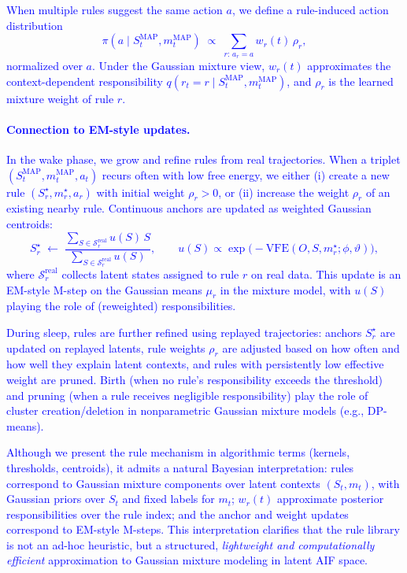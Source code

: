 \documentclass{article} %
\newcommand{\revise}[1]{\textcolor{blue}{#1}}
\begin{document}
\revise{When multiple rules suggest the same action $a$, we define a rule-induced action distribution
\[
\pi(a \mid S_t^{\mathrm{MAP}}, m_t^{\mathrm{MAP}}) \;\propto\;
\sum_{r:\,a_r = a} w_r(t)\,\rho_r,
\]
normalized over $a$. Under the Gaussian mixture view, $w_r(t)$ approximates the context-dependent responsibility $q(r_t = r \mid S_t^{\mathrm{MAP}},m_t^{\mathrm{MAP}})$, and $\rho_r$ is the learned mixture weight of rule $r$.}
\revise{\paragraph{Connection to EM-style updates.}
In the wake phase, we grow and refine rules from real trajectories. When a triplet $(S_t^{\mathrm{MAP}}, m_t^{\mathrm{MAP}}, a_t)$ recurs often with low free energy, we either (i) create a new rule $(S_r^\star, m_r^\star, a_r)$ with initial weight $\rho_r>0$, or (ii) increase the weight $\rho_r$ of an existing nearby rule. Continuous anchors are updated as weighted Gaussian centroids:
\[
S_r^\star \;\leftarrow\; 
\frac{\sum_{S \in \mathcal S_r^{\mathrm{real}}} u(S)\,S}
     {\sum_{S \in \mathcal S_r^{\mathrm{real}}} u(S)},
\qquad
u(S) \propto \exp\!\big(-\text{VFE}(O,S,m_r^\star;\phi,\vartheta)\big),
\]
where $\mathcal S_r^{\mathrm{real}}$ collects latent states assigned to rule $r$ on real data. This update is an EM-style M-step on the Gaussian means $\mu_r$ in the mixture model, with $u(S)$ playing the role of (reweighted) responsibilities.}

\revise{During sleep, rules are further refined using replayed trajectories: anchors $S_r^\star$ are updated on replayed latents, rule weights $\rho_r$ are adjusted based on how often and how well they explain latent contexts, and rules with persistently low effective weight are pruned. Birth (when no rule’s responsibility exceeds the threshold) and pruning (when a rule receives negligible responsibility) play the role of cluster creation/deletion in nonparametric Gaussian mixture models (e.g., DP-means).}


\revise{Although we present the rule mechanism in algorithmic terms (kernels, thresholds, centroids), it admits a natural Bayesian interpretation: rules correspond to Gaussian mixture components over latent contexts $(S_t,m_t)$, with Gaussian priors over $S_t$ and fixed labels for $m_t$; $w_r(t)$ approximate posterior responsibilities over the rule index; and the anchor and weight updates correspond to EM-style M-steps. This interpretation clarifies that the rule library is not an ad-hoc heuristic, but a structured, \emph{lightweight and computationally efficient} approximation to Gaussian mixture modeling in latent AIF space.}
\end{document}
